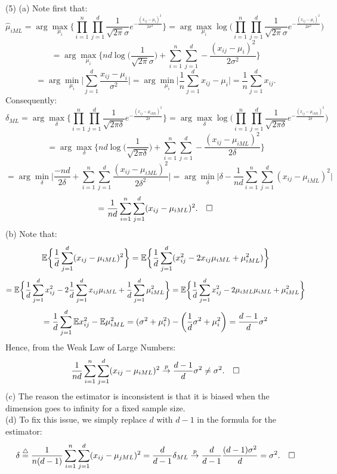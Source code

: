 \documentclass[12pt]{article}
\begin{document}
\pagebreak
\noindent
(5) (a) Note first that:
$$\hat\mu_{i ML} = \arg\max_{\mu_i} \biggl\{ \prod\limits_{i=1}^n \prod\limits_{j=1}^d \frac{1}{\sqrt{2\pi}\sigma}e^{-\frac{(x_{ij}-\mu_i)^2}{2\sigma^2}} \biggr\}
= \arg\max_{\mu_i} \log \biggl(\prod\limits_{i=1}^n \prod\limits_{j=1}^d \frac{1}{\sqrt{2\pi}\sigma}e^{-\frac{(x_{ij}-\mu_i)^2}{2\sigma^2}}\biggr)$$
$$= \arg\max_{\mu_i} \biggl\{ nd \log \biggl(\frac{1}{\sqrt{2\pi}\sigma}\biggr) + \sum\limits_{i=1}^n\sum\limits_{j=1}^d -\frac{(x_{ij}-\mu_i)^2}{2\sigma^2} \biggr\}$$
$$= \arg\min_{\mu_i} \biggl|\sum\limits_{j=1}^d \frac{x_{ij}-\mu_i}{\sigma^2} \biggr| 
= \arg\min_{\mu_i} \biggl|\frac{1}{n}\sum\limits_{j=1}^d x_{ij}-\mu_i \biggr| 
= \frac{1}{n}\sum\limits_{j=1}^d x_{ij}.$$
Consequently:
$$\delta_{ML} = \arg\max_\delta \biggl\{ \prod\limits_{i=1}^n \prod\limits_{j=1}^d \frac{1}{\sqrt{2\pi\delta}}e^{-\frac{(x_{ij}-\mu_{i ML})^2}{2\delta}} \biggr\}
= \arg\max_\delta \log \biggl(\prod\limits_{i=1}^n \prod\limits_{j=1}^d \frac{1}{\sqrt{2\pi\delta}}e^{-\frac{(x_{ij}-\mu_{i ML})^2}{2\delta}} \biggr)$$
$$= \arg\max_\delta \biggl\{ nd \log \biggl(\frac{1}{\sqrt{2\pi\delta}}\biggr) + \sum\limits_{i=1}^n\sum\limits_{j=1}^d -\frac{(x_{ij}-\mu_{i ML})^2}{2\delta} \biggr\}$$
$$= \arg\min_\delta \biggl| \frac{-nd}{2\delta} + \sum\limits_{i=1}^n\sum\limits_{j=1}^d \frac{(x_{ij}-\mu_{i ML})^2}{2\delta^2} \biggr|
= \arg\min_\delta \biggl| \delta - \frac{1}{nd}\sum\limits_{i=1}^n\sum\limits_{j=1}^d (x_{ij}-\mu_{i ML})^2 \biggr|$$
$$= \frac{1}{nd}\sum\limits_{i=1}^n\sum\limits_{j=1}^d (x_{ij}-\mu_{i ML})^2. \hspace{10 pt} \square$$
(b) Note that:
$$\mathbb{E} \biggl\{ \frac{1}{d} \sum\limits_{j=1}^d (x_{ij}-\mu_{i ML})^2 \biggr\} 
= \mathbb{E} \biggl\{\frac{1}{d} \sum\limits_{j=1}^d (x_{ij}^2-2x_{ij}\mu_{i ML}+\mu_{i ML}^2) \biggr\}$$
$$= \mathbb{E} \biggl\{\frac{1}{d} \sum\limits_{j=1}^d x_{ij}^2-2 \frac{1}{d} \sum\limits_{j=1}^dx_{ij}\mu_{i ML}+ \frac{1}{d} \sum\limits_{j=1}^d\mu_{i ML}^2 \biggr\}
 = \mathbb{E} \biggl\{\frac{1}{d} \sum\limits_{j=1}^d x_{ij}^2-2 \mu_{i ML} \mu_{i ML}+ \mu_{i ML}^2 \biggr\}$$
 $$=  \frac{1}{d} \sum\limits_{j=1}^d \mathbb{E} x_{ij}^2- \mathbb{E} \mu_{i ML}^2
 = (\sigma^2+\mu_i^2) - \biggl(\frac{1}{d}\sigma^2+\mu_i^2\biggr)
 = \frac{d-1}{d} \sigma^2$$
 Hence, from the Weak Law of Large Numbers:
 $$\frac{1}{nd}\sum\limits_{i=1}^n\sum\limits_{j=1}^d (x_{ij}-\mu_{i ML})^2 \overset{p}\to \frac{d-1}{d}\sigma^2 \neq \sigma^2. \hspace{10 pt} \square$$
(c) The reason the estimator is inconsistent is that it is biased when the dimension goes to infinity for a fixed sample size. \\
(d) To fix this issue, we simply replace $d$ with $d-1$ in the formula for the estimator:
$$\delta \overset{\triangle}=  \frac{1}{n(d-1)}\sum\limits_{i=1}^n\sum\limits_{j=1}^d (x_{ij}-\mu_{j ML})^2
= \frac{d}{d-1} \delta_{ML} \overset{p}\to \frac{d}{d-1} \frac{(d-1)\sigma^2}{d} = \sigma^2. \hspace{10 pt} \square$$
\end{document}
